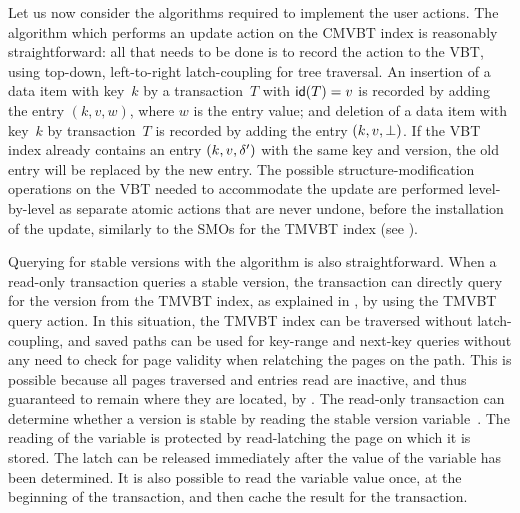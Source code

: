 Let us now consider the algorithms required to implement the user actions.
The algorithm  which performs an update action on the
CMVBT index is reasonably straightforward: all that needs to be done is
to record the action to the VBT, using top-down, left-to-right
latch-coupling for tree traversal.
An insertion of a data item with key~$k$ by a transaction~$T$
with $\text{\textsf{id}}(T) = v$ is recorded by adding the entry $(k, v, w)$, where
$w$ is the entry value;
and deletion of a data item with key~$k$ by transaction~$T$ is recorded
by adding the entry $(k, v, \bot)$. 
If the VBT index already contains an entry $(k, v, \delta')$ with the
same key and version, the old entry will be replaced by the new entry. 
The possible structure-modification operations on the VBT needed to
accommodate the update are performed level-by-level as separate atomic
actions that are never undone, before the installation of the update,
similarly to the SMOs for the TMVBT index (see ).

Querying for stable versions with the  algorithm is also
straightforward. 
When a read-only transaction queries a stable version, the transaction 
can directly query for the version from the TMVBT index, as explained in
, by using the TMVBT query action.
In this situation, the TMVBT index can be traversed without latch-coupling,
and saved paths can be used for key-range and next-key queries without any
need to check for page validity when relatching the pages on the path. 
This is possible because all pages traversed and entries read are
inactive, and thus guaranteed to remain where they are located, by
.
The read-only transaction can determine whether a version is stable by reading
the stable version variable~\stablever.
The reading of the variable is protected by read-latching the page on which it
is stored. 
The latch can be released immediately after the value of the variable
has been determined.
It is also possible to read the variable value once, at the beginning of the
transaction, and then cache the result for the transaction.

